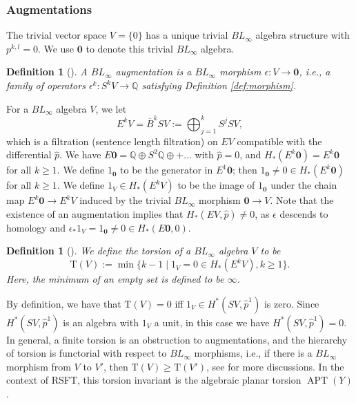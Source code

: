 \documentclass[11pt]{amsart}
\numberwithin{equation}{section}
\newtheorem{definition}[theorem]{\textbf{Definition}}
\def\Q{{\mathbb Q}}
\DeclareMathOperator{\APT}{APT}
\begin{document}
\subsubsection{Augmentations}
The trivial vector space $V=\{0\}$ has a unique trivial $BL_\infty$ algebra structure with $p^{k,l}=0$. We use $\mathbf{0}$ to denote this trivial $BL_\infty$ algebra.
\begin{definition}[{\cite[Definition 2.13]{moreno2024landscape}}]
A $BL_\infty$ augmentation is a $BL_\infty$ morphism $\epsilon:V \to \mathbf{0}$, i.e., a family of operators $\epsilon^k:S^kV \to \Q$ satisfying Definition \ref{def:morphism}.
\end{definition}

For a $BL_\infty$ algebra $V$, we let \begin{equation}\label{eq:B}
    E^kV=\overline{B}^kSV:=\bigoplus_{j=1}^k S^jSV,
\end{equation} which is a filtration (sentence length filtration) on $EV$ compatible with the differential $\widehat{p}$. We have $E\mathbf{0}=\Q \oplus S^2\Q \oplus +\ldots$ with $\widehat{p}=0$, and $H_*(E^k\mathbf{0})=E^k\mathbf{0}$ for all $k\ge 1$. We define $1_\mathbf{0}$ to be the generator in $E^1\mathbf{0}$; then $1_{\mathbf{0}}\ne 0\in H_*(E^k\mathbf{0})$ for all $k\ge 1$. We define $1_V\in H_*(E^kV)$ to be the image of $1_{\mathbf{0}}$ under the chain map $E^k\mathbf{0}\to E^kV$ induced by the trivial $BL_\infty$ morphism $\mathbf{0}\to V$. Note that the existence of an augmentation implies that $H_*(EV,\widehat{p})\neq 0$, as $\epsilon$ descends to homology and $\epsilon_*1_V=1_{\mathbf{0}}\ne 0\in H_*(E\mathbf{0},0)$.

\begin{definition}[{\cite[Definition 2.15]{moreno2024landscape}}]
We define the torsion of a $BL_\infty$ algebra $V$ to be
$$\mathrm{T}(V):= \min\{k-1\mid 1_V=0 \in H_*(E^kV),k\ge 1\}.$$
Here, the minimum of an empty set is defined to be $\infty$.
\end{definition}
By definition, we have that $\mathrm{T}(V)=0$ iff $1_V\in H^*(SV,\widehat{p}^1)$ is zero. Since $H^*(SV,\widehat{p}^1)$ is an algebra with $1_V$ a unit, in this case we have $H^*(SV,\widehat{p}^1)=0$. In general, a finite torsion is an obstruction to augmentations, and the hierarchy of torsion is functorial with respect to $BL_\infty$ morphisms, i.e., if there is a $BL_\infty$ morphism from $V$ to $V'$, then $\mathrm{T}(V)\ge \mathrm{T}(V')$, see \cite[\S 2.5]{moreno2024landscape} for more discussions. In the context of RSFT, this torsion invariant is the algebraic planar torsion $\APT(Y)$.
\end{document}
